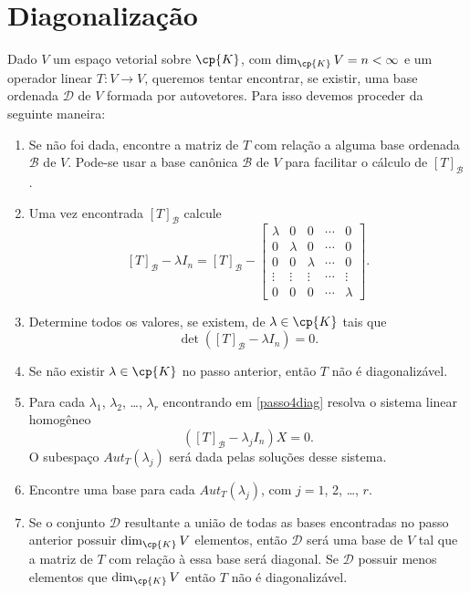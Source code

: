 \section{Diagonalização}
Dado $V$ um espaço vetorial sobre $\cp{K}$, com $\dim_\cp{K} V = n < \infty$ e um operador linear $T \colon V \to V$, queremos tentar encontrar, se existir, uma base ordenada $\mathcal{D}$ de $V$ formada por autovetores. Para isso devemos proceder da seguinte maneira:
\begin{enumerate}
    \item Se não foi dada, encontre a matriz de $T$ com relação a alguma base ordenada $\mathcal{B}$ de $V$. Pode-se usar a base canônica $\mathcal{B}$ de $V$ para facilitar o cálculo de $[T]_\mathcal{B}$.

    \item Uma vez encontrada $[T]_\mathcal{B}$ calcule
        \[
            [T]_\mathcal{B} - \lambda I_n = [T]_\mathcal{B} - \begin{bmatrix}\lambda & 0 & 0 & \cdots & 0\\0 & \lambda & 0 & \cdots & 0\\0 & 0 & \lambda & \cdots & 0\\\vdots & \vdots & \vdots & \cdots & \vdots\\0 & 0 & 0 & \cdots & \lambda\end{bmatrix}.
        \]

    \item\label{passo4diag} Determine todos os valores, se existem, de $\lambda \in \cp{K}$ tais que
        \[
            \det([T]_\mathcal{B} - \lambda I_n) = 0.
        \]

    \item Se não existir $\lambda \in \cp{K}$ no passo anterior, então $T$ não é diagonalizável.

    \item Para cada $\lambda_1$, $\lambda_2$, \dots, $\lambda_r$ encontrando em \eqref{passo4diag} resolva o sistema linear homogêneo
        \[
            ([T]_\mathcal{B} - \lambda_jI_n)X = 0.
        \]
        O subespaço $Aut_T(\lambda_j)$ será dada pelas soluções desse sistema.

    \item Encontre uma base para cada $Aut_T(\lambda_j)$, com $j = 1$, 2, \dots, $r$.

    \item Se o conjunto $\mathcal{D}$ resultante a união de todas as bases encontradas no passo anterior possuir $\dim_\cp{K}V$ elementos, então $\mathcal{D}$ será uma base de $V$ tal que a matriz de $T$ com relação à essa base será diagonal. Se $\mathcal{D}$ possuir menos elementos que $\dim_\cp{K}V$ então $T$ não é diagonalizável.
\end{enumerate}

